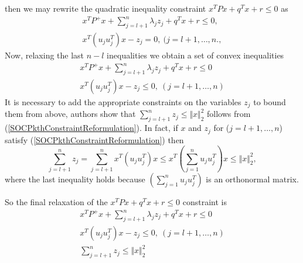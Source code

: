 \documentclass[12pt]{book}
\theoremstyle{definition}
\begin{document}
then we may rewrite the quadratic inequality constraint $x^TPx + q^Tx + r \leq 0$ as 
\begin{equation}
\begin{array}{l}
\label{SOCPkthConstraintReformulation}
x^TP^+x + \sum_{j = l + 1}^n \lambda_j z_j + q^Tx + r \leq 0, \\
x^T(u_ju_j^T)x - z_j = 0, \ ( j= l+1, \dots ,n., 
\end{array}
\end{equation}
Now, relaxing the last $n-l$ inequalities we obtain a set of convex inequalities 
\begin{equation}
\begin{array}{l}
\label{SOCPrelax2}
x^TP^+x + \sum_{j = l + 1}^n \lambda_j z_j + q^Tx + r \leq 0 \\
x^T(u_ju_j^T)x - z_j \leq 0, \ ( j= l+1, \dots ,n) 
\end{array}
\end{equation}
It is necessary to add the appropriate constraints on the variables $z_j$ to bound them from above, authors 
show that $\sum_{j=l+1}^n z_j \leq \Vert x\Vert_2^2$ follows from (\ref{SOCPkthConstraintReformulation}). 
In fact, if $x$ and $z_j$ for ($j = l+1,\dots ,n$) satisfy (\ref{SOCPkthConstraintReformulation})
then 
\begin{equation}
\sum_{j=l+1}^n z_j = \sum_{j=l+1}^nx^T(u_ju_j^T)x \leq  x^T \left(\sum_{j=1}^nu_ju_j^T\right)x \leq \Vert x\Vert_2^2,
\end{equation}
where the last inequality holds because $\left(\sum_{j=1}^nu_ju_j^T\right)$ is an orthonormal matrix.

So the final relaxation of the  $x^TPx + q^Tx + r \leq 0$ constraint is
\begin{equation}
\begin{array}{l}
\label{SOCPrelax3}
x^TP^+x + \sum_{j = l + 1}^n \lambda_j z_j + q^Tx + r \leq 0 \\
x^T(u_ju_j^T)x - z_j \leq 0, \ ( j= l+1, \dots ,n) \\
\sum_{j=l+1}^n z_j \leq \Vert x\Vert_2^2
\end{array}
\end{equation}
\end{document}
